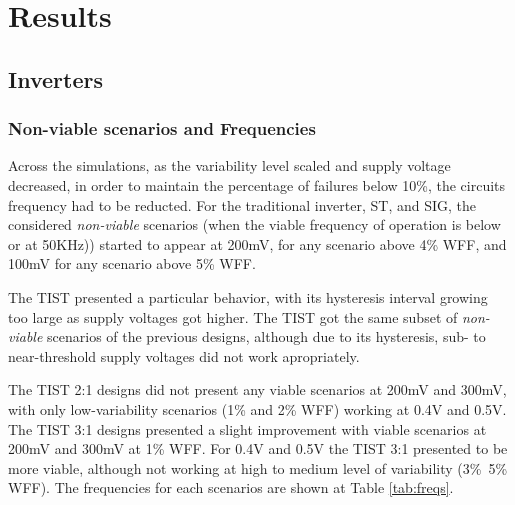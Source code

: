 \documentclass[pgmicro,mestrado,english]{iiufrgs}
\begin{document}
\chapter{Results}

\section{Inverters}

\subsection{Non-viable scenarios and Frequencies}

Across the simulations, as the variability level scaled and supply voltage decreased, in order to maintain the percentage of failures below 10\%, the circuits frequency had to be reducted. For the traditional inverter, ST, and SIG, the considered \textit{non-viable} scenarios (when the viable frequency of operation is below or at 50KHz)) started to appear at 200mV, for any scenario above 4\% WFF, and 100mV for any scenario above 5\% WFF.

The TIST presented a particular behavior, with its hysteresis interval growing too large as supply voltages got higher. The TIST got the same subset of \textit{non-viable} scenarios of the previous designs, although due to its hysteresis, sub- to near-threshold supply voltages did not work apropriately. 

The TIST 2:1 designs did not present any viable scenarios at 200mV and 300mV, with only low-variability scenarios (1\% and 2\% WFF) working at 0.4V and 0.5V. The TIST 3:1 designs presented a slight improvement with viable scenarios at 200mV and 300mV at 1\% WFF. For 0.4V and 0.5V the TIST 3:1 presented to be more viable, although not working at high to medium level of variability (3\%~5\% WFF). The frequencies for each scenarios are shown at Table \ref{tab:freqs}.
\end{document}
